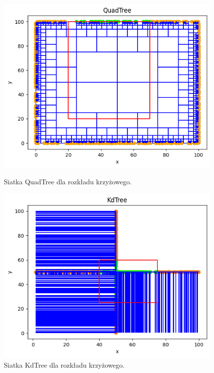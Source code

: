 \documentclass{lab}
\begin{document}
\begin{figure}[H]
  \centering
  \begin{minipage}{0.495\textwidth}
      \centering
      \includegraphics[width=1\textwidth]{resources/cross_QuadTree.png}
      \caption{Siatka QuadTree dla rozkładu krzyżowego.}
      \label{fig:cross_QuadTree}
  \end{minipage}
  \begin{minipage}{0.495\textwidth}
      \centering
      \includegraphics[width=1\textwidth]{resources/cross_KdTree.png}
      \caption{Siatka KdTree dla rozkładu krzyżowego.}
      \label{fig:cross_KdTree}
  \end{minipage}
\end{figure}
\end{document}
